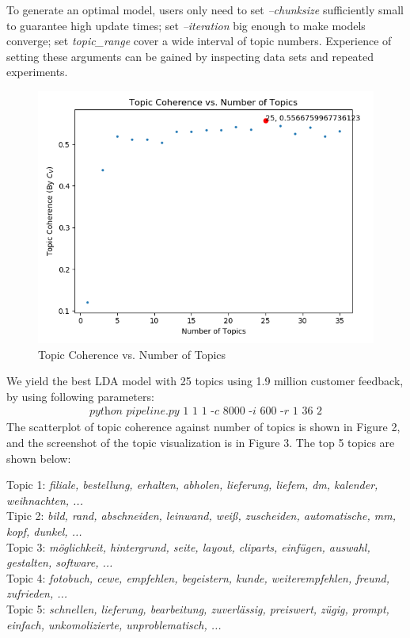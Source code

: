 \documentclass{article} %
\begin{document}
To generate an optimal model, users only need to set \textit{--chunksize} sufficiently small to guarantee high update times; set \textit{--iteration} big enough to make models converge; set \textit{topic\_range} cover a wide interval of topic numbers. Experience of setting these arguments can be gained by inspecting data sets and repeated experiments. 

\begin{figure}[H]
      \graphicspath{ {images/} }
      \begin{center}
            \includegraphics[scale=0.8]{coherence.png}
      \end{center}
      \caption{Topic Coherence vs. Number of Topics}
\end{figure}

We yield the best LDA model with 25 topics using 1.9 million customer feedback, by using following parameters: 
\begin{align}
      \textit{python pipeline.py 1 1 1 -c 8000 -i 600 -r 1 36 2}
\end{align} 
 The scatterplot of topic coherence against number of topics is shown in Figure 2, and the screenshot of the topic visualization is in Figure 3. The top 5 topics are shown below:

Topic 1: \textit{filiale, bestellung, erhalten, abholen, lieferung, liefem, dm, kalender, weihnachten, ...}\\
Tipic 2: \textit{bild, rand, abschneiden, leinwand, weiß, zuscheiden, automatische, mm, kopf, dunkel, ...}\\
Topic 3: \textit{möglichkeit, hintergrund, seite, layout, cliparts, einfügen, auswahl, gestalten, software, ...}\\
Topic 4: \textit{fotobuch, cewe, empfehlen, begeistern, kunde, weiterempfehlen, freund, zufrieden, ...}\\
Topic 5: \textit{schnellen, lieferung, bearbeitung, zuverlässig, preiswert, zügig, prompt, einfach, unkomolizierte, unproblematisch, ...}
\end{document}
